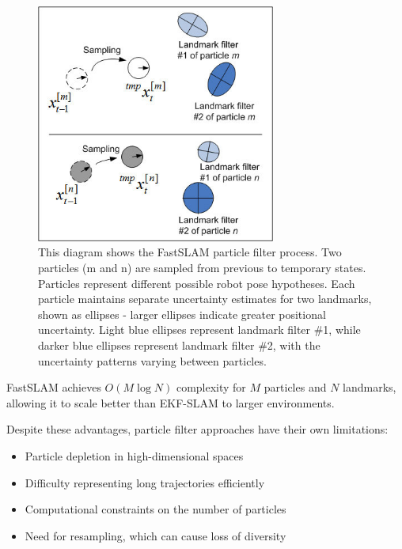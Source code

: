 \documentclass[12pt]{article}
\begin{document}
    \newpage
    \begin{figure}[h!]
        \centering
        \includegraphics[width=0.7\textwidth]{fast_slam_img.png}
        \caption{This diagram shows the FastSLAM particle filter process. Two particles (m and n) are sampled from previous to temporary states. Particles represent different possible robot pose hypotheses. 
        Each particle maintains separate uncertainty estimates for two landmarks, shown as ellipses - larger ellipses indicate greater positional uncertainty. 
        Light blue ellipses represent landmark filter \#1, while darker blue ellipses represent landmark filter \#2, with the uncertainty patterns varying between particles. \cite{fast_slam_img}}
        \label{fig:fast_slam_img}
    \end{figure}
    
    FastSLAM achieves $O(M \log N)$ complexity for $M$ particles and $N$ landmarks, allowing it to scale better than EKF-SLAM to larger environments.
    
    Despite these advantages, particle filter approaches have their own limitations:
    \begin{itemize}
        \item Particle depletion in high-dimensional spaces
        \item Difficulty representing long trajectories efficiently
        \item Computational constraints on the number of particles
        \item Need for resampling, which can cause loss of diversity
    \end{itemize}
    
\end{document}

